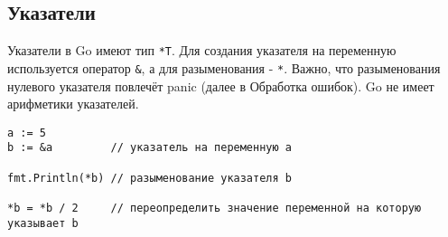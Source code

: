 \subsection{Указатели}
Указатели в Go имеют тип \verb|*T|. Для создания указателя на переменную используется оператор \verb|&|, а для разыменования - \verb|*|.
\noindent Важно, что разыменования нулевого указателя повлечёт panic (далее в Обработка ошибок).
\noindent Go не имеет арифметики указателей.
\begin{verbatim}
a := 5
b := &a         // указатель на переменную a

fmt.Println(*b) // разыменование указателя b

*b = *b / 2     // переопределить значение переменной на которую указывает b
\end{verbatim}
